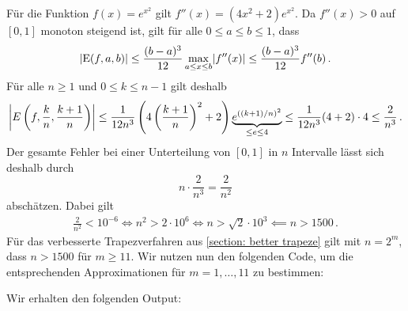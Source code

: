 \section{}

Für die Funktion $f(x) = e^{x^2}$ gilt $f''(x) = (4x^2 + 2) e^{x^2}$.
Da $f''(x) > 0$ auf $[0,1]$ monoton steigend ist, gilt für alle $0 \leq a \leq b \leq 1$, dass
\[
        \abs{ \operatorname{E}(f,a,b) }
  \leq  \frac{(b-a)^3}{12} \max_{a \leq x \leq b} \abs{f''(x)}
  \leq  \frac{(b-a)^3}{12} f''(b)\,.
\]
Für alle $n \geq 1$ und $0 \leq k \leq n-1$ gilt deshalb
\[
        \abs*{ E\left( f, \frac{k}{n}, \frac{k+1}{n} \right) }
  \leq  \frac{1}{12 n^3} \left( 4 \left(\frac{k+1}{n}\right)^2 + 2 \right) \underbrace{e^{((k+1)/n)^2}}_{\leq e \leq 4}
  \leq  \frac{1}{12 n^3} (4 + 2) \cdot 4
  \leq  \frac{2}{n^3}\,.
\]
Der gesamte Fehler bei einer Unterteilung von $[0,1]$ in $n$ Intervalle lässt sich deshalb durch
\[
      n \cdot \frac{2}{n^3}
    = \frac{2}{n^2}
\]
abschätzen.
Dabei gilt
\begin{align*}
              \frac{2}{n^2} < 10^{-6}
  \iff        n^2 > 2 \cdot 10^6
  \iff        n > \sqrt{2} \cdot 10^3
  \impliedby  n > 1500\,.
\end{align*}
Für das verbesserte Trapezverfahren aus \ref{section: better trapeze} gilt mit $n = 2^m$, dass $n > 1500$ für $m \geq 11$.
Wir nutzen nun den folgenden Code, um die entsprechenden Approximationen für $m = 1, \dotsc, 11$ zu bestimmen:



Wir erhalten den folgenden Output:

